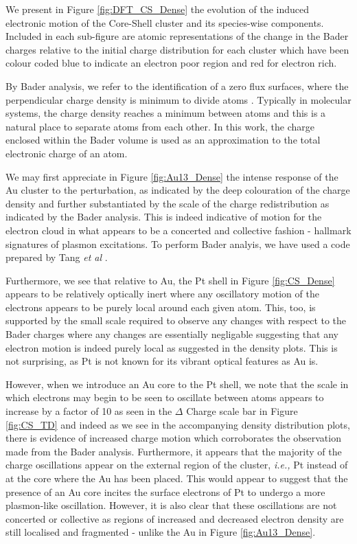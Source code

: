 We present in Figure \ref{fig:DFT_CS_Dense} the evolution of the induced electronic motion of the Core-Shell cluster and its species-wise components. Included in each sub-figure are atomic representations of the change in the Bader charges \cite{doi:10.1021/ar00109a003} relative to the initial charge distribution for each cluster which have been colour coded blue to indicate an electron poor region and red for electron rich.

By Bader analysis, we refer to the identification of a zero flux surfaces, where the perpendicular charge density is minimum to divide atoms \cite{doi:10.1021/ar00109a003}. Typically in molecular systems, the charge density reaches a minimum between atoms and this is a natural place to separate atoms from each other. In this work, the charge enclosed within the Bader volume is used as an approximation to the total electronic charge of an atom. 

We may first appreciate in Figure \ref{fig:Au13_Dense} the intense response of the Au cluster to the perturbation, as indicated by the deep colouration of the charge density and further substantiated by the scale of the charge redistribution as indicated by the Bader analysis. This is indeed indicative of motion for the electron cloud in what appears to be a concerted and collective fashion - hallmark signatures of plasmon excitations. To perform Bader analyis, we have used a code prepared by Tang \textit{et al} \cite{Bader}.

Furthermore, we see that relative to Au, the Pt shell in Figure \ref{fig:CS_Dense} appears to be relatively optically inert where any oscillatory motion of the electrons appears to be purely local around each given atom. This, too, is supported by the small scale required to observe any changes with respect to the Bader charges where any changes are essentially negligable suggesting that any electron motion is indeed purely local as suggested in the density plots. This is not surprising, as Pt is not known for its vibrant optical features as Au is.

However, when we introduce an Au core to the Pt shell, we note that the scale in which electrons may begin to be seen to oscillate between atoms appears to increase by a factor of 10 as seen in the $\Delta$ Charge scale bar in Figure \ref{fig:CS_TD} and indeed as we see in the accompanying density distribution plots, there is evidence of increased charge motion which corroborates the observation made from the Bader analysis. Furthermore, it appears that the majority of the charge oscillations appear on the external region of the cluster, \textit{i.e.,} Pt instead of at the core where the Au has been placed. This would appear to suggest that the presence of an Au core incites the surface electrons of Pt to undergo a more plasmon-like oscillation. However, it is also clear that these oscillations are not concerted or collective as regions of increased and decreased electron density are still localised and fragmented - unlike the Au in Figure \ref{fig:Au13_Dense}.

